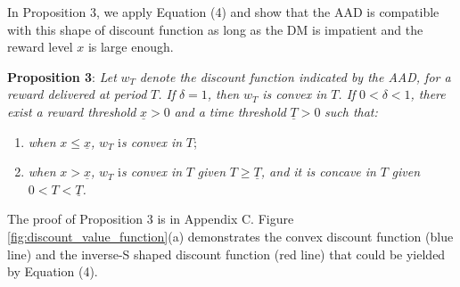 \documentclass[
  12pt,
]{article}
\providecommand{\tightlist}{%
  \setlength{\itemsep}{0pt}\setlength{\parskip}{0pt}}
\begin{document}
In Proposition 3, we apply Equation (4) and show that the AAD is
compatible with this shape of discount function as long as the DM is
impatient and the reward level \(x\) is large enough.

\noindent \textbf{Proposition 3}: \emph{Let} \(w_T\) \emph{denote the
discount function indicated by the AAD, for a reward delivered at
period} \(T\)\emph{. If} \(\delta =1\)\emph{, then} \(w_T\) \emph{is
convex in} \(T\)\emph{. If} \(0<\delta<1\)\emph{, there exist a reward
threshold} \(\underline{x}>0\) \emph{and a time threshold}
\(\underline{T}>0\) \emph{such that:}

\begin{enumerate}
\def\labelenumi{(\alph{enumi})}
\tightlist
\item
  \emph{when} \(x\leq \underline{x}\)\emph{,} \(w_T\) i\emph{s convex
  in} \(T\);
\item
  \emph{when} \(x > \underline{x}\)\emph{,} \(w_T\) i\emph{s convex in}
  \(T\) \emph{given} \(T\geq \underline{T}\)\emph{, and it is concave
  in} \(T\) \emph{given} \(0<T<\underline{T}\)\emph{.}
\end{enumerate}

The proof of Proposition 3 is in Appendix C. Figure
\ref{fig:discount_value_function}(a) demonstrates the convex discount
function (blue line) and the inverse-S shaped discount function (red
line) that could be yielded by Equation (4).
\end{document}
